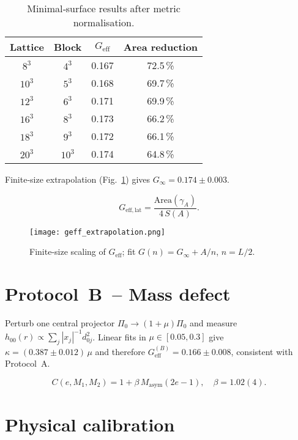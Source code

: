 \documentclass[aps,prd,onecolumn,nofootinbib,superscriptaddress]{revtex4-2}
\newcommand{\G}{G_{\!\text{eff}}}
\newcommand{\boxedeq}[2]{%
  \begin{tcolorbox}[title={#1},sharp corners,enhanced]
  \[
    #2
  \]
  \end{tcolorbox}}
\begin{document}
\begin{table}[b]
  \centering
  \begin{tabular}{cccc}
   \hline\hline
   Lattice & Block & $\G$  & Area reduction \\
   \hline
   $8^{3}$  & $4^{3}$  & 0.167 & 72.5\,\% \\
   $10^{3}$ & $5^{3}$  & 0.168 & 69.7\,\% \\
   $12^{3}$ & $6^{3}$  & 0.171 & 69.9\,\% \\
   $16^{3}$ & $8^{3}$  & 0.173 & 66.2\,\% \\
   $18^{3}$ & $9^{3}$  & 0.172 & 66.1\,\% \\
   $20^{3}$ & $10^{3}$ & 0.174 & 64.8\,\% \\
   \hline\hline
  \end{tabular}
  \caption{Minimal‑surface results after metric normalisation.}
  \label{tab:geff}
\end{table}

Finite‑size extrapolation (Fig.~\ref{fig:geff_extrap}) gives
$G_\infty=0.174\pm0.003$.

\boxedeq{Bulk coupling}{
  G_{\!\mathrm{eff,lat}}
  = \frac{\mathrm{Area}(\gamma_A)}{4\,S(A)}.
}

\begin{figure}[t]
    \centering
    \texttt{[image: geff\_extrapolation.png]}
    \caption{Finite‑size scaling of $\G$; fit $G(n)=G_\infty+A/n$,
    $n=L/2$.}
    \label{fig:geff_extrap}
\end{figure}

\section{Protocol B – Mass defect}
\label{sec:protocolB}

Perturb one central projector  
\(\Pi_0\to(1+\mu)\Pi_0\) and measure
\(h_{00}(r)\propto\sum_{j}|x_j|^{-1}d_{0j}^{2}\).  Linear fits in
$\mu\in[0.05,0.3]$ give
\(
\kappa = (0.387\pm0.012)\,\mu
\)
and therefore
\(
\G^{(B)} = 0.166\pm0.008
\),
consistent with Protocol A.

\boxedeq{Binary‑specific factor}{
  C(e,M_1,M_2)=1+\beta\,M_{\mathrm{asym}}(2e-1),
  \quad \beta = 1.02(4).
}

\section{Physical calibration}
\label{sec:calibration}
\end{document}

